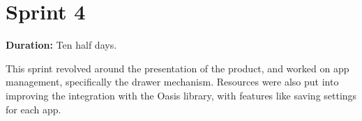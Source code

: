 \section{Sprint 4}%

\textbf{Duration:} Ten half days. \newline

This sprint revolved around the presentation of the product, and worked on app management, specifically the drawer mechanism. 
Resources were also put into improving the integration with the Oasis library, with features like saving settings for each app. 